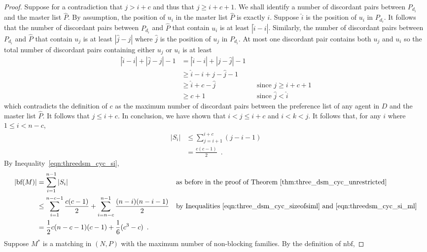 \begin{proof}
Suppose for a contradiction that $j > i + c$ and thus that $j \geq i + c + 1$. We shall identify a number of discordant pairs between $P_{d_{i}}$ and the master list $\hat{P}$. By assumption, the position of $u_{i}$ in the master list $\hat{P}$ is exactly $i$. Suppose $\hat{i}$ is the position of $u_{i}$ in $P_{d_{i}}$. It follows that the number of discordant pairs between $P_{d_{i}}$ and $\hat{P}$ that contain $u_{i}$ is at least $|\hat{i} - i|$. Similarly, the number of discordant pairs between $P_{d_{i}}$ and $\hat{P}$ that contain $u_j$ is at least $|\hat{j} - j|$ where $\hat{j}$ is the position of $u_j$ in $P_{d_{i}}$. At most one discordant pair contains both $u_j$ and $u_{i}$ so the total number of discordant pairs containing either $u_j$ or $u_i$ is at least
\begin{align*}
    |\hat{i} - i| + |\hat{j} - j| - 1
    &= |\hat{i} - i| + |j - \hat{j}| - 1\\
    &\geq \hat{i} - i + j - \hat{j} - 1\\
    &\geq \hat{i} + c - \hat{j} && \mbox{since $j \geq i + c + 1$}\\
    &\geq c + 1 && \mbox{since $\hat{j} < \hat{i}$}
\end{align*}
which contradicts the definition of $c$ as the maximum number of discordant pairs between the preference list of any agent in $D$ and the master list $\hat{P}$. It follows that $j \leq i + c$. In conclusion, we have shown that $i < j \leq i + c$ and $i < k < j$.
It follows that, for any $i$ where $1\leq i < n - c$,
\begin{align}
    |S_{i}| &\leq \sum\limits_{j={i}+1}^{i + c} (j - i - 1)\nonumber\\
    &= \frac{c(c-1)}{2}\label{eqn:threedsm_cyc_si_ml}\enspace.
\end{align}
By Inequality~\ref{eqn:threedsm_cyc_si},
\begin{align}
    |\text{bf}(M)| &= \sum\limits_{i=1}^{n-1} |S_i| && \mbox{as before in the proof of Theorem~\ref{thm:three_dsm_cyc_unrestricted}}\nonumber\\
    &\leq \sum\limits_{i=1}^{n-c-1} \frac{c(c - 1)}{2} + \sum\limits_{i = n - c}^{n - 1} \frac{(n - i)(n - i - 1)}{2} && \mbox{by Inequalities~\ref{eqn:three_dsm_cyc_sizeofsiml} and~\ref{eqn:threedsm_cyc_si_ml}}\nonumber\\
    &= \frac{1}{2}c(n - c - 1)(c - 1) + \frac{1}{6}(c^3 - c) \label{eqn:threedsm_cyc_bf_ml}\enspace.
\end{align}
Suppose $M^*$ is a matching in $(N, P)$ with the maximum number of non-blocking families. By the definition of $\text{nbf}$,

\end{proof}
